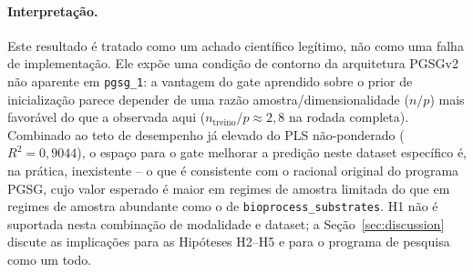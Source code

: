 \paragraph{Interpretação.} Este resultado é tratado como um achado científico legítimo, não como uma falha de implementação. Ele expõe uma condição de contorno da arquitetura PGSGv2 não aparente em \texttt{pgsg\_1}: a vantagem do gate aprendido sobre o prior de inicialização parece depender de uma razão amostra/dimensionalidade ($n/p$) mais favorável do que a observada aqui ($n_{\text{treino}}/p \approx 2{,}8$ na rodada completa). Combinado ao teto de desempenho já elevado do PLS não-ponderado ($R^2=0{,}9044$), o espaço para o gate melhorar a predição neste dataset específico é, na prática, inexistente -- o que é consistente com o racional original do programa PGSG, cujo valor esperado é maior em regimes de amostra limitada do que em regimes de amostra abundante como o de \texttt{bioprocess\_substrates}. H1 não é suportada nesta combinação de modalidade e dataset; a Seção~\ref{sec:discussion} discute as implicações para as Hipóteses H2--H5 e para o programa de pesquisa como um todo.
